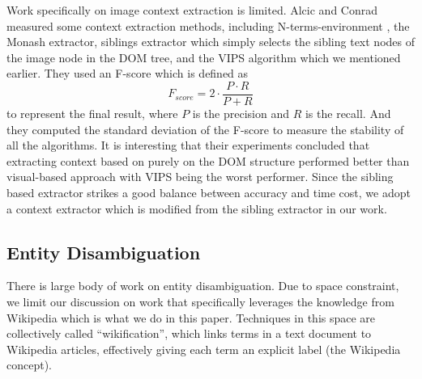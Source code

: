 Work specifically on image context extraction is limited.
Alcic and Conrad \cite{Alcic2010} measured some context extraction methods, including
N-terms-environment \cite{Coelho2004}, the Monash extractor\cite{Fauzi2009},
siblings extractor which simply selects the sibling text nodes of the image node
in the DOM tree, and the VIPS \cite{VIPS} algorithm which we mentioned earlier.
They used an F-score which is defined as
$$F_{score} = 2 \cdot \frac{P \cdot R}{P + R}$$
to represent the final result, where $P$ is the precision and $R$ is the recall.
And they computed the standard deviation of the F-score to measure the stability
of all the algorithms.
It is interesting that their experiments concluded that extracting context
based on purely on the DOM structure performed better than visual-based approach with
VIPS being the worst performer. Since the sibling based extractor strikes a good
balance between accuracy and time cost, we adopt a context extractor
which is modified from the sibling extractor in our work.

\subsection{Entity Disambiguation}
\label{wikification}

There is large body of work on entity disambiguation. Due to space constraint,
we limit our discussion on work that specifically leverages the knowledge from
Wikipedia which is what we do in this paper.
Techniques in this space are collectively called ``wikification'', which links
terms in a text document to Wikipedia articles, effectively giving each term
an explicit label (the Wikipedia concept).

